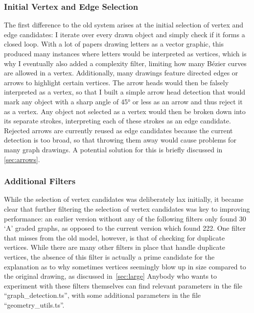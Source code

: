 \documentclass[practical,english]{info1thesis}
\begin{document}
\subsubsection{Initial Vertex and Edge Selection}
The first difference to the old system arises at the initial selection of vertex and edge candidates:
I iterate over every drawn object and simply check if it forms a closed loop. 
With a lot of papers drawing letters as a vector graphic, this produced many instances where letters would be interpreted as vertices, which is why I eventually also added a complexity filter, limiting how many Bézier curves are allowed in a vertex.
Additionally, many drawings feature directed edges or arrows to highlight certain vertices.
The arrow heads would then be falsely interpreted as a vertex, so that I built a simple arrow head detection that would mark any object with a sharp angle of 45° or less as an arrow and thus reject it as a vertex.
Any object not selected as a vertex would then be broken down into its separate strokes, interpreting each of these strokes as an edge candidate. 
Rejected arrows are currently reused as edge candidates because the current detection is too broad, so that throwing them away would cause problems for many graph drawings.
A potential solution for this is briefly discussed in \cref{sec:arrows}.

\subsubsection{Additional Filters}
While the selection of vertex candidates was deliberately lax initially, it became clear that further filtering the selection of vertex candidates was key to improving performance:
an earlier version without any of the following filters only found 30 `A' graded graphs, as opposed to the current version which found 222.
One filter that misses from the old model, however, is that of checking for duplicate vertices.
While there are many other filters in place that handle duplicate vertices, the absence of this filter is actually a prime candidate for the explanation as to why sometimes vertices seemingly blow up in size compared to the original drawing, as discussed in~\cref{sec:large}
Anybody who wants to experiment with these filters themselves can find relevant parameters in the file ``graph\_detection.ts'', with some additional parameters in the file ``geometry\_utils.ts''.
\end{document}
